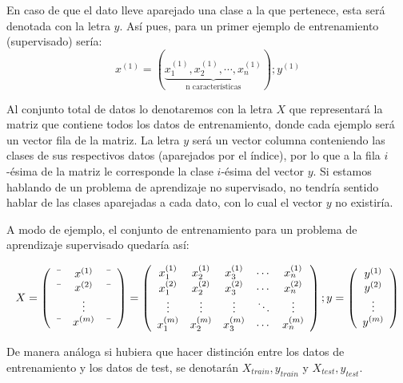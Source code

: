 En caso de que el dato lleve aparejado una clase a la que pertenece, esta será denotada con la letra 
$y$. Así pues, para un primer ejemplo de entrenamiento (supervisado) sería:
$$ x^{(1)}=(\underbrace{x^{(1)}_1, x^{(1)}_2, \cdots, x^{(1)}_n}_{\text{n características}}); y^{(1)} $$

Al conjunto total de datos lo denotaremos con la letra $X$ que representará la matriz que contiene
todos los datos de entrenamiento, donde cada ejemplo será un vector fila de la matriz.
La letra $y$ será un vector columna conteniendo las clases de sus respectivos datos (aparejados por el índice), 
por lo que a la fila $i$-ésima de la matriz le corresponde la clase $i$-ésima del vector $y$.
Si estamos hablando de un problema de aprendizaje no supervisado, no tendría sentido hablar de las clases 
aparejadas a cada dato, con lo cual el vector $y$ no existiría.

A modo de ejemplo, el conjunto de entrenamiento para un problema de aprendizaje supervisado quedaría así:

$$
X = \left(\begin{array}{ccc}
    \textemdash & x^{(1)} & \textemdash \\
    \textemdash & x^{(2)} & \textemdash \\
     & \vdots &  \\
    \textemdash & x^{(m)} & \textemdash \\
\end{array}\right)
%
=
  \left(\begin{array}{ccccc}
    x^{(1)}_1 & x^{(1)}_2 & x^{(1)}_3 & \cdots & x^{(1)}_n \\
    x^{(2)}_1 & x^{(2)}_2 & x^{(2)}_3 & \cdots & x^{(2)}_n \\
    \vdots & \vdots & \vdots & \ddots & \vdots \\
    x^{(m)}_1 & x^{(m)}_2 & x^{(m)}_3 & \cdots & x^{(m)}_n \\
\end{array}\right)
%
;
y = \left(\begin{array}{c}
    y^{(1)} \\
    y^{(2)} \\
    \vdots \\
    y^{(m)} \\
\end{array}\right)
$$

De manera análoga si hubiera que hacer distinción entre los datos de entrenamiento y los datos de test, 
se denotarán $X_{train}, y_{train}$ y $X_{test}, y_{test}$.


